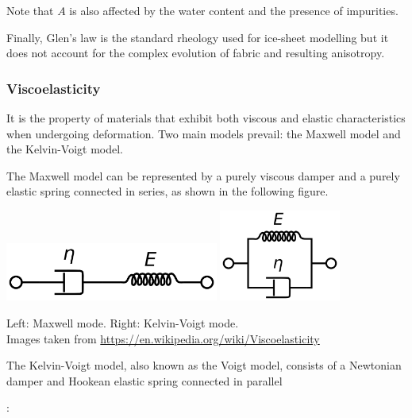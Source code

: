 Note that $A$ is also affected by the water content and the presence of impurities. 

Finally, Glen's law is the standard rheology used for ice-sheet modelling 
but it does not account for the complex evolution of fabric and resulting anisotropy.

\Literature \cite{grev97,krab16,grbl09,issg15,heah18}

\subsubsection{Viscoelasticity} 


It is the property of materials that exhibit both viscous and elastic 
characteristics when undergoing deformation.
Two main models prevail: the Maxwell model and the Kelvin-Voigt model. 

The Maxwell model can be represented by a purely viscous damper and 
a purely elastic spring connected in series, as shown in the following figure. 

\begin{center}
\includegraphics[width=7cm]{images/rheology/Maxwell_diagram}
\hspace{1cm}
\includegraphics[width=4cm]{images/rheology/Kelvin_Voigt_diagram}

{\captionfont Left: Maxwell mode. Right: Kelvin-Voigt mode.\\ 
Images taken from \url{https://en.wikipedia.org/wiki/Viscoelasticity}}
\end{center}

The Kelvin-Voigt model, also known as the Voigt model, 
consists of a Newtonian damper and Hookean elastic spring connected in parallel

\Literature: \cite{boph12}

